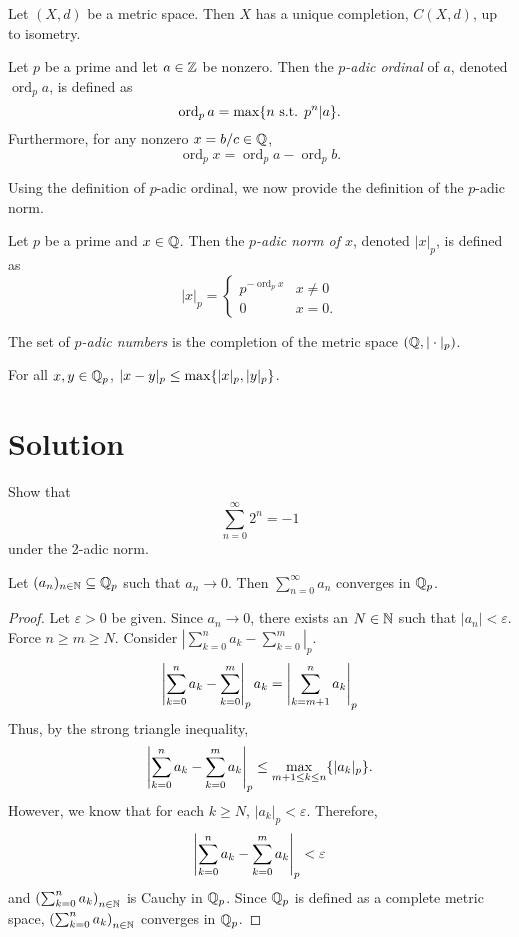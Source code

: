 \documentclass[notitlepage]{problem-solving}
\def\ord{\operatorname{ord}}
\begin{document}
\begin{thm}
	Let $(X,d)$ be a metric space.
	Then $X$ has a unique completion, $C(X,d)$, up to isometry.
\end{thm}

\begin{definition}
	Let $p$ be a prime and let $a\in\mathbb{Z}$ be nonzero.
	Then the \textit{$p$-adic ordinal} of $a$, denoted $\ord_p a$, is defined as
	\[
		\ord_p a = \max\set{n\text{ s.t. } p^n | a}.
	\]
	Furthermore, for any nonzero $x=b/c\in\mathbb{Q}$,
	\[
		\ord_p x = \ord_p a - \ord_p b.
	\]
\end{definition}

Using the definition of $p$-adic ordinal, we now provide the definition of the $p$-adic norm.

\begin{definition}
	Let $p$ be a prime and $x\in\mathbb{Q}$.
	Then the \textit{$p$-adic norm of $x$}, denoted $|x|_p$, is defined as
	\[
		|x|_p =
		\begin{cases}
			p^{-\ord_p x} & x\neq 0\\
			0 & x=0.
		\end{cases}
	\]
\end{definition}

\begin{definition}
	The set of \textit{$p$-adic numbers} is the completion of the metric space $(\mathbb{Q},|\cdot|_p)$.
\end{definition}

\begin{thm}
	For all $x,y\in\mathbb{Q}_p$, $|x-y|_p\leq\max\lbrace |x|_p,|y|_p \rbrace$.
\end{thm}

\section{Solution}

\begin{problem*}
	Show that
	\[
		\sum_{n=0}^\infty 2^n = -1
	\]
	under the 2-adic norm.
\end{problem*}

\begin{thm}
	Let $(a_n)_{n\in\mathbb{N}}\subseteq\mathbb{Q}_p$ such that $a_n\rightarrow 0$.
	Then $\sum_{n=0}^\infty a_n$ converges in $\mathbb{Q}_p$.
\end{thm}
\begin{proof}
	Let $\varepsilon > 0$ be given.
	Since $a_n\rightarrow 0$, there exists an $N\in\mathbb{N}$ such that $|a_n|<\varepsilon$.
	Force $n\geq m\geq N$.
	Consider $|\sum_{k=0}^n a_k - \sum_{k=0}^m|_p$.
	\[
		\left| \sum_{k=0}^n a_k - \sum_{k=0}^m \right|_p a_k = \left| \sum_{k=m+1}^n a_k \right|_p
	\]
	Thus, by the strong triangle inequality,
	\[
		\left| \sum_{k=0}^n a_k - \sum_{k=0}^m a_k \right|_p \leq \max\limits_{m+1\leq k\leq n}\lbrace |a_k|_p \rbrace.
	\]
	However, we know that for each $k\geq N$, $|a_k|_p<\varepsilon$.
	Therefore,
	\[
		\left| \sum_{k=0}^n a_k - \sum_{k=0}^m a_k \right|_p < \varepsilon
	\]
	and $\left( \sum_{k=0}^n a_k \right)_{n\in\mathbb{N}}$ is Cauchy in $\mathbb{Q}_p$.
	Since $\mathbb{Q}_p$ is defined as a complete metric space, $\left( \sum_{k=0}^n a_k \right)_{n\in\mathbb{N}}$ converges in $\mathbb{Q}_p$.
\end{proof}
\end{document}
